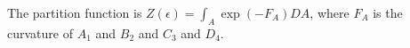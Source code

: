 \documentclass{article}
\begin{document}
The partition function is $Z(\epsilon) =

\int_{A} \exp(-F_{A}) D A$, where $F_{A}$ is the curvature of $A_1$ and $B_2$ and $C_3$ and $D_4$.
\end{document}
